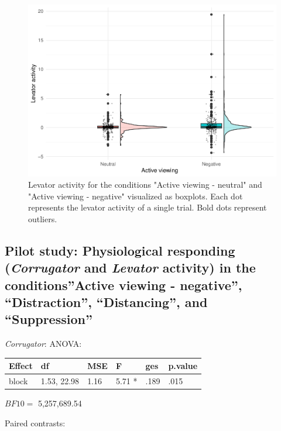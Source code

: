 \documentclass[
  man,floatsintext]{apa6}
\begin{document}
\begin{figure}[H]
\includegraphics[width=0.75\linewidth]{Manuscript_ERED_Stage2_files/figure-latex/FigEMGLevViewPilot-1} \caption{Levator activity for the conditions "Active viewing - neutral" and "Active viewing - negative" visualized as boxplots. Each dot represents the levator activity of a single trial. Bold dots represent outliers.}\label{fig:FigEMGLevViewPilot}
\end{figure}

\hypertarget{pilot-study-physiological-responding-corrugator-and-levator-activity-in-the-conditionsactive-viewing---negative-distraction-distancing-and-suppression}{%
\subsection{\texorpdfstring{Pilot study: Physiological responding (\emph{Corrugator} and \emph{Levator} activity) in the conditions''Active viewing - negative'', ``Distraction'', ``Distancing'', and ``Suppression''}{Pilot study: Physiological responding (Corrugator and Levator activity) in the conditions''Active viewing - negative'', ``Distraction'', ``Distancing'', and ``Suppression''}}\label{pilot-study-physiological-responding-corrugator-and-levator-activity-in-the-conditionsactive-viewing---negative-distraction-distancing-and-suppression}}

\emph{Corrugator}: ANOVA:

\begin{tabular}{l|l|l|l|l|l}
\hline
Effect & df & MSE & F & ges & p.value\\
\hline
block & 1.53, 22.98 & 1.16 & 5.71 * & .189 & .015\\
\hline
\end{tabular}

\(BF10=\) 5,257,689.54

Paired contrasts:
\end{document}
